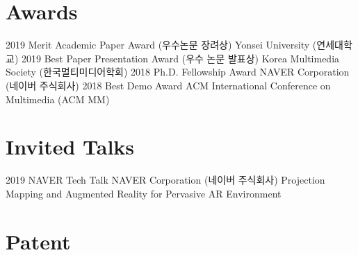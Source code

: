 \documentclass[]{friggeri-cv}
\begin{document}
\begin{refsection}
  \nocite{*}
  \printbibliography[
    type=inproceedings, 
    title=\textbf{Conference proceedings}, 
    heading=subbibliography,
    keyword={selected}
  ]
\end{refsection}

\section{Awards}

\begin{entrylist}
\entry
    {2019}
    {Merit Academic Paper Award (우수논문 장려상)}
    {}
    {Yonsei University (연세대학교)}
\entry
    {2019}
    {Best Paper Presentation Award (우수 논문 발표상)}
    {}
    {Korea Multimedia Society (한국멀티미디어학회)}
\entry
    {2018}
    {Ph.D. Fellowship Award}
    {}
    {NAVER Corporation (네이버 주식회사)}
\entry
    {2018}
    {Best Demo Award}
    {}
    {ACM International Conference on Multimedia (ACM MM)}
\end{entrylist}

\section{Invited Talks}

\begin{entrylist}
\entry
    {2019}
    {NAVER Tech Talk}
    {NAVER Corporation (네이버 주식회사)}
    {Projection Mapping and Augmented Reality for Pervasive AR Environment}
\end{entrylist}

\section{Patent}

\begin{refsection}
  \nocite{*}
  \printbibliography[
    type=misc, 
    title=\textbf{Domestic (Republic of Korea)}, 
    heading=subbibliography,
    keyword={patent}
  ]
\end{refsection}
\end{document}

